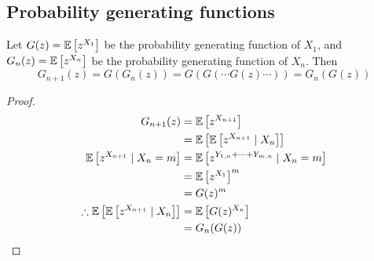 \subsection{Probability generating functions}
\begin{theorem}
	Let \(G(z) = \mathbb{E}\left[{z^{X_1}}\right]\) be the probability generating function of \(X_1\), and \(G_n(z) = \mathbb{E}\left[{z^{X_n}}\right]\) be the probability generating function of \(X_n\).
	Then
	\[
		G_{n+1}(z) = G(G_n(z)) = G(G(\cdots G(z)\cdots)) = G_n(G(z))
	\]
\end{theorem}
\begin{proof}
	\begin{align*}
		G_{n+1}(z)                                        & = \mathbb{E}\left[{z^{X_{n+1}}}\right]                                 \\
		                                                  & = \mathbb{E}\left[{\mathbb{E}\left[{z^{X_{n+1}} \mid X_n}\right]}\right]               \\
		\mathbb{E}\left[{z^{X_{n+1}} \mid X_n = m}\right]                 & = \mathbb{E}\left[{z^{Y_{1, n} + \dots + Y_{m,n}} \mid X_n = m}\right] \\
		                                                  & = \mathbb{E}\left[{z^{X_1}}\right]^m                                   \\
		                                                  & = G(z)^m                                               \\
		\therefore \mathbb{E}\left[{\mathbb{E}\left[{z^{X_{n+1}} \mid X_n}\right]}\right] & = \mathbb{E}\left[{G(z)^{X_n}}\right]                                  \\
		                                                  & = G_n(G(z))
	\end{align*}
\end{proof}

